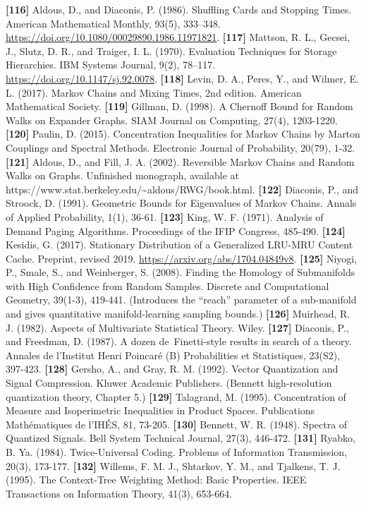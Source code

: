 \documentclass[
]{article}
\begin{document}
\textbf{{[}116{]}} Aldous, D., and
Diaconis, P. (1986). Shuffling Cards and Stopping Times. American
Mathematical Monthly, 93(5), 333--348.
\url{https://doi.org/10.1080/00029890.1986.11971821}.
\textbf{{[}117{]}} Mattson, R. L., Gecsei, J., Slutz,
D. R., and Traiger, I. L. (1970). Evaluation Techniques for Storage
Hierarchies. IBM Systems Journal, 9(2), 78--117.
\url{https://doi.org/10.1147/sj.92.0078}.
\textbf{{[}118{]}} Levin, D. A., Peres, Y., and Wilmer, E. L. (2017).
Markov Chains and Mixing Times, 2nd edition. American Mathematical
Society.
\textbf{{[}119{]}} Gillman, D. (1998). A Chernoff Bound for Random
Walks on Expander Graphs. SIAM Journal on Computing, 27(4),
1203-1220.
\textbf{{[}120{]}} Paulin, D. (2015). Concentration Inequalities
for Markov Chains by Marton Couplings and Spectral Methods.
Electronic Journal of Probability, 20(79), 1-32.
\textbf{{[}121{]}} Aldous, D., and Fill, J. A. (2002).
Reversible Markov Chains and Random Walks on Graphs.
Unfinished monograph, available at
https://www.stat.berkeley.edu/\textasciitilde aldous/RWG/book.html.
\textbf{{[}122{]}} Diaconis, P., and Stroock, D. (1991). Geometric
Bounds for Eigenvalues of Markov Chains. Annals of Applied
Probability, 1(1), 36-61.
\textbf{{[}123{]}} King, W. F. (1971). Analysis of Demand Paging
Algorithms. Proceedings of the IFIP Congress, 485-490.
\textbf{{[}124{]}} Kesidis, G. (2017). Stationary Distribution of a
Generalized LRU-MRU Content Cache. Preprint, revised 2019.
\url{https://arxiv.org/abs/1704.04849v8}.
\textbf{{[}125{]}} Niyogi, P., Smale, S., and Weinberger, S. (2008).
Finding the Homology of Submanifolds with High Confidence from
Random Samples. Discrete and Computational Geometry, 39(1-3),
419-441. (Introduces the ``reach'' parameter of a sub-manifold and
gives quantitative manifold-learning sampling bounds.)
\textbf{{[}126{]}} Muirhead, R. J. (1982). Aspects of Multivariate
Statistical Theory. Wiley.
\textbf{{[}127{]}} Diaconis, P., and Freedman, D. (1987).
A dozen de~Finetti-style results in search of a theory. Annales de
l'Institut Henri Poincar\'e (B) Probabilities et Statistiques, 23(S2),
397-423.
\textbf{{[}128{]}} Gersho, A., and Gray, R. M. (1992). Vector
Quantization and Signal Compression. Kluwer Academic Publishers.
(Bennett high-resolution quantization theory, Chapter 5.)
\textbf{{[}129{]}} Talagrand, M. (1995). Concentration of Measure
and Isoperimetric Inequalities in Product Spaces. Publications
Math\'ematiques de l'IH\'ES, 81, 73-205.
\textbf{{[}130{]}} Bennett, W. R. (1948). Spectra of Quantized
Signals. Bell System Technical Journal, 27(3), 446-472.
\textbf{{[}131{]}} Ryabko, B. Ya. (1984). Twice-Universal Coding.
Problems of Information Transmission, 20(3), 173-177.
\textbf{{[}132{]}} Willems, F. M. J., Shtarkov, Y. M., and Tjalkens,
T. J. (1995). The Context-Tree Weighting Method: Basic Properties.
IEEE Transactions on Information Theory, 41(3), 653-664.
\end{document}
